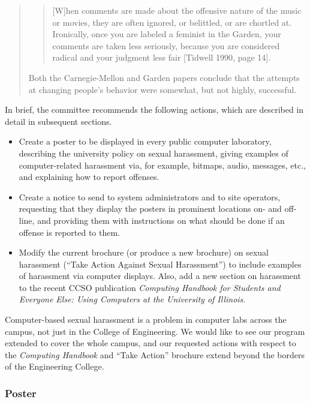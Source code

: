 \begin{quote}
\begin{quote}

     [W]hen comments are made about the offensive nature of the music or movies, they are often ignored,
     or belittled, or are chortled at. Ironically, once you
     are labeled a feminist in the Garden, your comments
     are taken less seriously, because you are considered
     radical and your judgment less fair [Tidwell 1990,
     page 14].
\end{quote}

Both the Carnegie-Mellon and Garden papers conclude that
the attempts at changing people's behavior were somewhat,
but not highly, successful.


\end{quote}


In brief, the committee recommends the following actions,
which are described in detail in subsequent sections.

\begin{itemize}
\item{Create a poster to be displayed in every public computer laboratory,
describing the university policy on sexual
harassment, giving examples of  computer-related harassment via, for example, 
bitmaps, audio, messages, etc., and explaining how to report offenses.}
\item{Create a notice to send to system administrators and
to site operators, requesting that
they display the posters in prominent locations on- and off-line,
and providing them with instructions on
what should be done if an offense is reported to them.}
\item
Modify the current brochure (or produce a new brochure)
on sexual harassment (``Take Action
Against Sexual Harassment'') to include
examples of harassment via computer displays.
Also, add a new section on harassment
to the recent CCSO publication {\sl Computing Handbook
for Students and Everyone Else: Using Computers at
the University of Illinois}.
\end{itemize}

Computer-based sexual harassment is a problem in computer labs across
the campus, not just in the College of Engineering.
We would like to see our program extended to cover the whole campus,
and our requested actions with respect to the {\em Computing Handbook}
and ``Take Action'' brochure extend beyond the borders of the Engineering
College.

\subsubsection{Poster}

